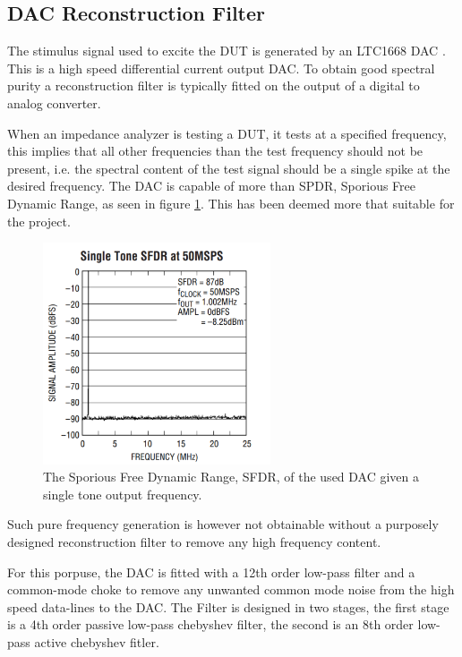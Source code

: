 \subsection{DAC Reconstruction Filter} \label{subsec:DAC_Filter}
The stimulus signal used to excite the DUT is generated by an LTC1668 DAC \cite{DAC_LTC1668}. This is a high speed differential current output DAC. To obtain good spectral purity a reconstruction filter is typically fitted on the output of a digital to analog converter.

When an impedance analyzer is testing a DUT, it tests at a specified frequency, this implies that all other frequencies than the test frequency should not be present, i.e. the spectral content of the test signal should be a single spike at the desired frequency. The DAC is capable of more than  SPDR, Sporious Free Dynamic Range, as seen in figure \ref{fig_7_1_1_SFDR}. This has been deemed more that suitable for the project. 

\begin{figure}[H]
    \centering
    \includegraphics[clip, trim=0 0 0 0, width=0.6\textwidth]{Sections/7_SystemDesign/Figures/7_1_1_DAC_SingleTone_SFDR.pdf}
    \caption{The Sporious Free Dynamic Range, SFDR, of the used DAC given a single tone output frequency.}
    \label{fig_7_1_1_SFDR}
\end{figure}

Such pure frequency generation is however not obtainable without a purposely designed reconstruction filter to remove any high frequency content.

For this porpuse, the DAC is fitted with a 12th order low-pass filter and a common-mode choke to remove any unwanted common mode noise from the high speed data-lines to the DAC. The Filter is designed in two stages, the first stage is a 4th order passive low-pass chebyshev filter, the second is an 8th order low-pass active chebyshev fitler.

